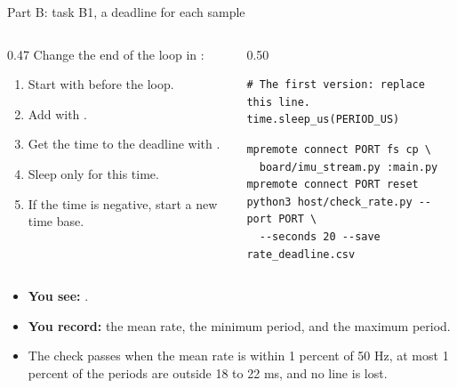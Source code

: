 \begin{frame}[fragile]{Part B: task B1, a deadline for each sample}
  \begin{columns}[T]
    \begin{column}{0.47\textwidth}
      \small
      Change the end of the loop in :
      \begin{enumerate}
        \item Start  with  before
              the loop.
        \item Add  with .
        \item Get the time to the deadline with .
        \item Sleep only for this time.
        \item If the time is negative, start a new time base.
      \end{enumerate}
    \end{column}
    \begin{column}{0.50\textwidth}
\begin{lstlisting}[style=python]
# The first version: replace this line.
time.sleep_us(PERIOD_US)
\end{lstlisting}
\begin{lstlisting}[style=shell]
mpremote connect PORT fs cp \
  board/imu_stream.py :main.py
mpremote connect PORT reset
python3 host/check_rate.py --port PORT \
  --seconds 20 --save rate_deadline.csv
\end{lstlisting}
    \end{column}
  \end{columns}
  \small
  \begin{itemize}
    \item \textbf{You see:} .
    \item \textbf{You record:} the mean rate, the minimum period, and the
          maximum period.
    \item The check passes when the mean rate is within 1 percent of 50 Hz,
          at most 1 percent of the periods are outside 18 to 22 ms, and no
          line is lost.
  \end{itemize}
\end{frame}

